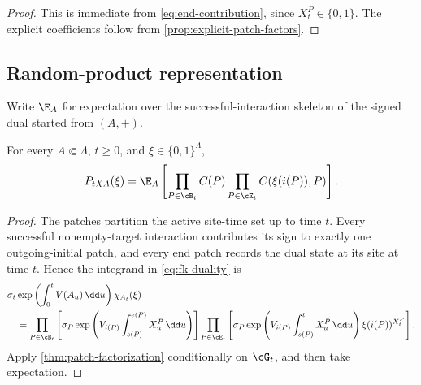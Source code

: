 \begin{proof}
This is immediate from \eqref{eq:end-contribution}, since
\(X_t^P\in\{0,1\}\). The explicit coefficients follow from
\cref{prop:explicit-patch-factors}.
\end{proof}

\subsection{Random-product representation}

\begin{notation}
\label{not:skeleton-expectation}
Write \(\E_A\) for expectation over the successful-interaction
skeleton of the signed dual started from \((A,+)\).
\end{notation}

\begin{theorem}
\label{thm:patch-representation}
For every \(A\Subset\Lambda\), \(t\ge0\), and
\(\xi\in\{0,1\}^{\Lambda}\),
\begin{equation}
  P_t\chi_A(\xi)
  =
  \E_A\left[
    \prod_{P\in\cB_t}C(P)
    \prod_{P\in\cE_t}C(\xi(i(P)),P)
  \right].
  \label{eq:patch-representation}
\end{equation}
\end{theorem}

\begin{proof}
The patches partition the active site-time set up to time \(t\).
Every successful nonempty-target interaction contributes its sign to
exactly one outgoing-initial patch, and every end patch records the
dual state at its site at time \(t\). Hence the integrand in
\eqref{eq:fk-duality} is
\begin{align*}
  &\sigma_t
  \exp\left(\int_0^tV(A_u)\,\dd u\right)
  \chi_{A_t}(\xi)
  \\
  &\quad=
  \prod_{P\in\cB_t}
  \left[
    \sigma_P
    \exp\left(
      V_{i(P)}
      \int_{s(P)}^{e(P)}X_u^P\,\dd u
    \right)
  \right]
  \prod_{P\in\cE_t}
  \left[
    \sigma_P
    \exp\left(
      V_{i(P)}
      \int_{s(P)}^tX_u^P\,\dd u
    \right)
    \xi(i(P))^{X_t^P}
  \right].
\end{align*}
Apply \cref{thm:patch-factorization} conditionally on \(\cG_t\), and
then take expectation.
\end{proof}

